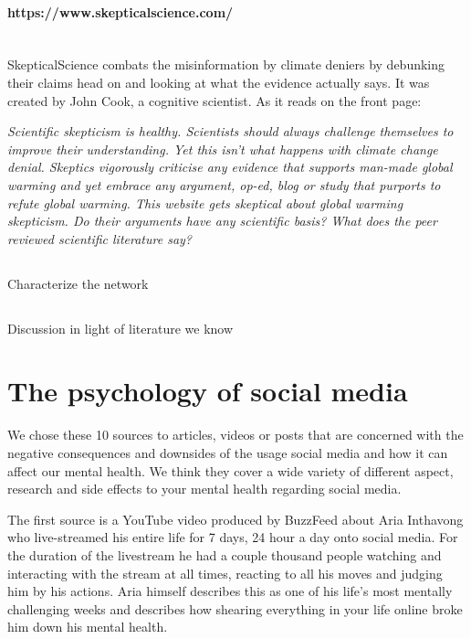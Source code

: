 \documentclass[11pt]{article}
\begin{document}
\paragraph{https://www.skepticalscience.com/} \hspace{0pt} \\
SkepticalScience combats the misinformation by climate deniers by debunking their
claims head on and looking at what the evidence actually says. It was created by
John Cook, a cognitive scientist. As it reads on the front page:

\begin{displayquote}
\textit{Scientific skepticism is healthy. Scientists should always challenge themselves to
improve their understanding. Yet this isn't what happens with climate change denial.
Skeptics vigorously criticise any evidence that supports man-made global warming and
yet embrace any argument, op-ed, blog or study that purports to refute global warming.
This website gets skeptical about global warming skepticism. Do their arguments have
any scientific basis? What does the peer reviewed scientific literature say?}
\end{displayquote}

\subsection{}
Characterize the network

\subsection{}
Discussion in light of literature we know

\section{The psychology of social media}

We chose these 10 sources to articles, videos or posts that are concerned with the
negative consequences and downsides of the usage social media and how it can affect
our mental health. We think they cover a wide variety of different aspect, research
and side effects to your mental health regarding social media.

The first source \cite{youtube1} is a YouTube video produced by BuzzFeed about Aria
Inthavong who live-streamed his entire life for 7 days, 24 hour a day onto social media.
For the duration of the livestream he had a couple thousand people watching and interacting
with the stream at all times, reacting to all his moves and judging him by his actions.
Aria himself describes this as one of his life's most mentally challenging weeks and
describes how shearing everything in your life online broke him down his mental health.
\end{document}
